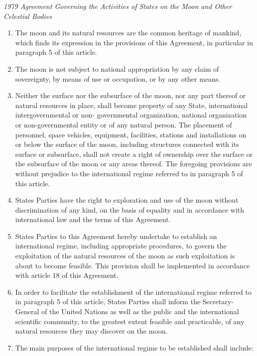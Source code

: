 \begin{conventiondetails}{\textit{1979 Agreement Governing the Activities of States on the Moon and Other Celestial Bodies}}
    \flushleft
    \begin{enumerate}
        \item The moon and its natural resources are the common heritage of mankind, which finds its expression in the provisions of this Agreement, in particular in paragraph 5 of this article.
        \item The moon is not subject to national appropriation by any claim of sovereignty, by means of use or occupation, or by any other means.
        \item Neither the surface nor the subsurface of the moon, nor any part thereof or natural resources in place, shall become property of any State, international intergovernmental or non- governmental organization, national organization or non-governmental entity or of any natural person. The placement of personnel, space vehicles, equipment, facilities, stations and installations on or below the surface of the moon, including structures connected with its surface or subsurface, shall not create a right of ownership over the surface or the subsurface of the moon or any areas thereof. The foregoing provisions are without prejudice to the international regime referred to in paragraph 5 of this article.
        \item States Parties have the right to exploration and use of the moon without discrimination of any kind, on the basis of equality and in accordance with international law and the terms of this Agreement.
        \item States Parties to this Agreement hereby undertake to establish an international regime, including appropriate procedures, to govern the exploitation of the natural resources of the moon as such exploitation is about to become feasible. This provision shall be implemented in accordance with article 18 of this Agreement.
        \item In order to facilitate the establishment of the international regime referred to in paragraph 5 of this article, States Parties shall inform the Secretary-General of the United Nations as well as the public and the international scientific community, to the greatest extent feasible and practicable, of any natural resources they may discover on the moon.
        \item The main purposes of the international regime to be established shall include:

\end{enumerate}
\end{conventiondetails}
